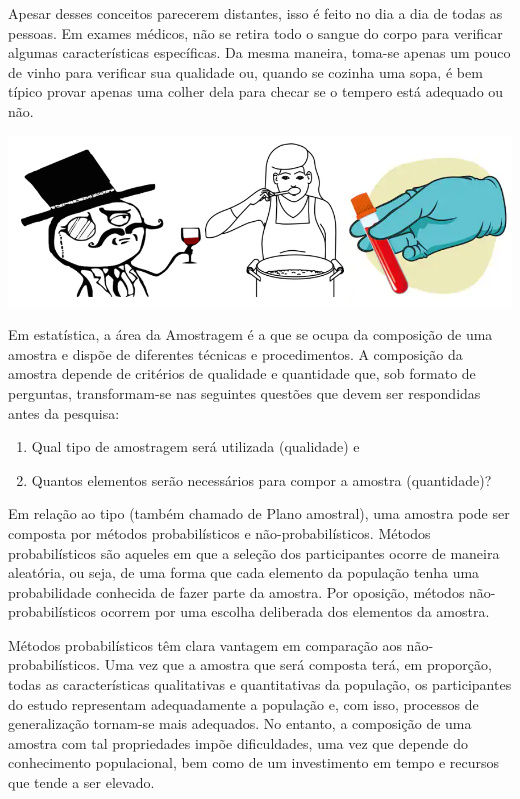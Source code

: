 \documentclass[
]{book}
\providecommand{\tightlist}{%
  \setlength{\itemsep}{0pt}\setlength{\parskip}{0pt}}
\begin{document}
Apesar desses conceitos parecerem distantes, isso é feito no dia a dia de todas as pessoas. Em exames médicos, não se retira todo o sangue do corpo para verificar algumas características específicas. Da mesma maneira, toma-se apenas um pouco de vinho para verificar sua qualidade ou, quando se cozinha uma sopa, é bem típico provar apenas uma colher dela para checar se o tempero está adequado ou não.

\includegraphics{./img/cap_amostra_desenhos.png}

Em estatística, a área da Amostragem é a que se ocupa da composição de uma amostra e dispõe de diferentes técnicas e procedimentos. A composição da amostra depende de critérios de qualidade e quantidade que, sob formato de perguntas, transformam-se nas seguintes questões que devem ser respondidas antes da pesquisa:

\begin{enumerate}
\def\labelenumi{\arabic{enumi})}
\tightlist
\item
  Qual tipo de amostragem será utilizada (qualidade) e\\
\item
  Quantos elementos serão necessários para compor a amostra (quantidade)?
\end{enumerate}

Em relação ao tipo (também chamado de Plano amostral), uma amostra pode ser composta por métodos probabilísticos e não-probabilísticos. Métodos probabilísticos são aqueles em que a seleção dos participantes ocorre de maneira aleatória, ou seja, de uma forma que cada elemento da população tenha uma probabilidade conhecida de fazer parte da amostra. Por oposição, métodos não-probabilísticos ocorrem por uma escolha deliberada dos elementos da amostra.

Métodos probabilísticos têm clara vantagem em comparação aos não-probabilísticos. Uma vez que a amostra que será composta terá, em proporção, todas as características qualitativas e quantitativas da população, os participantes do estudo representam adequadamente a população e, com isso, processos de generalização tornam-se mais adequados. No entanto, a composição de uma amostra com tal propriedades impõe dificuldades, uma vez que depende do conhecimento populacional, bem como de um investimento em tempo e recursos que tende a ser elevado.
\end{document}
